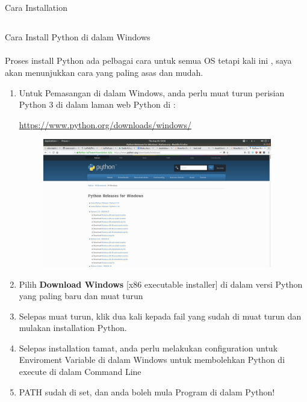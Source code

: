\section{}
Cara Installation
\subsection{}
Cara Install Python di dalam Windows

\paragraph{}
Proses install Python ada pelbagai cara untuk semua OS tetapi kali ini , saya akan menunjukkan cara yang paling asas dan mudah.

\begin{enumerate}
	\item  Untuk Pemasangan di dalam Windows, anda perlu muat turun perisian Python 3 di dalam laman web Python di : 

	\url{https://www.python.org/downloads/windows/}

		\begin{figure}[H]
		\centering
		\includegraphics[width=10cm]{./img/1.png}
	\end{figure}

	\item Pilih \textbf{Download Windows} [x86 executable installer] di dalam versi Python yang paling baru dan muat turun
	\item Selepas muat turun, klik dua kali kepada fail yang sudah di muat turun dan mulakan installation Python.
	\item Selepas installation tamat, anda perlu melakukan configuration untuk Enviroment Variable di dalam Windows untuk membolehkan Python di execute di dalam Command Line
	\item PATH sudah di set, dan anda boleh mula Program di dalam Python!

\end{enumerate}


